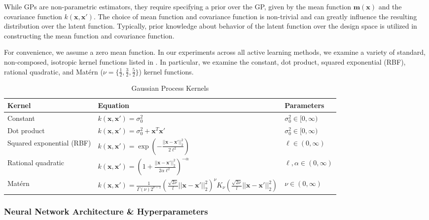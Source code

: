 \documentclass[conference]{IEEEtran}
\begin{document}
	While GPs are non-parametric estimators, they require specifying a prior over the GP, given by the mean function $\boldsymbol{m}(\boldsymbol{x})$ and the covariance function $k(\boldsymbol{x}, \boldsymbol{x}')$. The choice of mean function and covariance function is non-trivial and can greatly influence the resulting distribution over the latent function. Typically, prior knowledge about behavior of the latent function over the design space is utilized in constructing the mean function and covariance function.
	
	For convenience, we assume a zero mean function. In our experiments across all active learning methods, we examine a variety of standard, non-composed, isotropic kernel functions listed in . In particular, we examine the constant, dot product, squared exponential (RBF), rational quadratic, and Mat\'ern ($\nu = \{\tfrac{1}{2}, \tfrac{3}{2}, \tfrac{5}{2}\}$) kernel functions. 
	
	\begin{table*}[htbp]
    \renewcommand{\arraystretch}{2.2}
    \centering
    \caption{Gaussian Process Kernels}
    \label{tab:gp_kernels}
        \begin{tabular}{lll}
        \toprule 
        \bfseries Kernel & \bfseries Equation & \bfseries Parameters \\ \midrule
	    Constant &  $k(\mathbf{x}, \mathbf{x}') = \sigma_0^2$ & $\sigma_0^2 \in [0, \infty)$ \\
	    Dot product & $k(\mathbf{x}, \mathbf{x}') = \sigma_0^2 + \mathbf{x}^T \mathbf{x}'$ & $\sigma_0^2 \in [0, \infty)$ \\
	    Squared exponential (RBF) & $k(\mathbf{x}, \mathbf{x}') = \exp \left( -\frac{||\mathbf{x} - \mathbf{x}'||_2^2}{2\ell^2} \right)$ & $\ell \in (0, \infty)$ \\
	    Rational quadratic & $k(\mathbf{x}, \mathbf{x}') = \left(1+\frac{||\mathbf{x} - \mathbf{x}'||_2^2}{2\alpha \ell^2}\right)^{-\alpha}$ & $\ell, \alpha \in (0, \infty)$ \\
	    Mat\'ern & $k(\mathbf{x}, \mathbf{x}') = \frac{1}{\Gamma(\nu)2^{\nu-1}}\left(\frac{\sqrt{2\nu}}{l} ||\mathbf{x} - \mathbf{x}'||_2^2 \right)^\nu K_\nu\left(\frac{\sqrt{2\nu}}{l} ||\mathbf{x} - \mathbf{x}'||_2^2 \right)$ & $\nu \in (0, \infty)$ \\ \bottomrule
	    \end{tabular}
	\end{table*}
	
	\subsubsection{Neural Network Architecture \& Hyperparameters}
	
\end{document}
